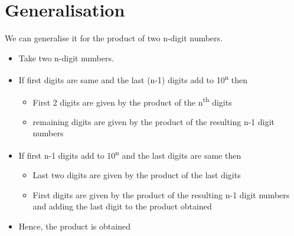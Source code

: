\documentclass{article}
\begin{document}
\section{Generalisation}
We can generalise it for the product of two n-digit numbers.
\begin{itemize}
\item Take two n-digit numbers.
\item If first  digits are same and the last (n-1) digits add to 10\textsuperscript{n} then
	\begin{itemize}
	\item First 2 digits are given by the product of the n\textsuperscript{th} digits
	\item remaining digits are given by the product of the resulting n-1 digit numbers
	\end{itemize}
\item If first n-1 digits add to 10\textsuperscript{n} and the last digits are same then
	\begin{itemize}
	\item Last two digits are given by the product of the last digits
	\item First digits are given by the product of the resulting n-1 digit numbers and adding the last digit to the product obtained
	\end{itemize}
\item Hence, the product is obtained
\end{itemize}


\end{document}
